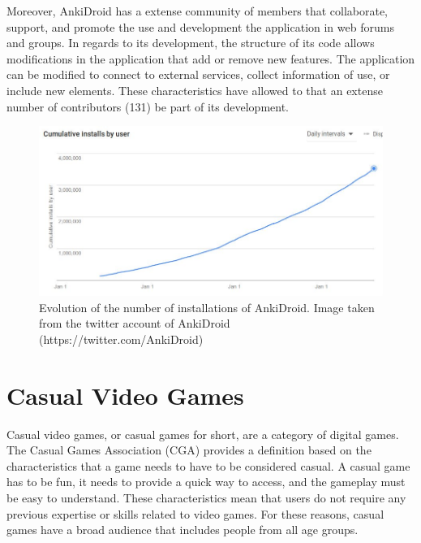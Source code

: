 Moreover, AnkiDroid has a extense community of members that collaborate, support, and promote the use and development the application in web forums and groups. In regards to its development, the structure of its code allows modifications in the application that add or remove new features. The application can be modified to connect to external services, collect information of use, or include new elements. These characteristics have allowed to that an extense number of contributors (131) be part of its development.

\begin{figure}[htb]
    \vskip 5mm
        \begin{center}
            \includegraphics[scale=0.4]{./Figures/anki_progress.jpg}
            \caption{Evolution of the number of installations of AnkiDroid. Image taken from the twitter account of AnkiDroid (https://twitter.com/AnkiDroid)}
            \label{fig:anki-evolution}
        \end{center}
    \vskip -5mm
\end{figure}


\section{Casual Video Games}
Casual video games, or casual games for short, are a category of digital games. The Casual Games Association (CGA) provides a definition based on the characteristics that a game needs to have to be considered casual. A casual game has to be fun, it needs to provide a quick way to access, and the gameplay must be easy to understand. These characteristics mean that users do not require any previous expertise or skills related to video games. For these reasons, casual games have a broad audience that includes people from all age groups.

